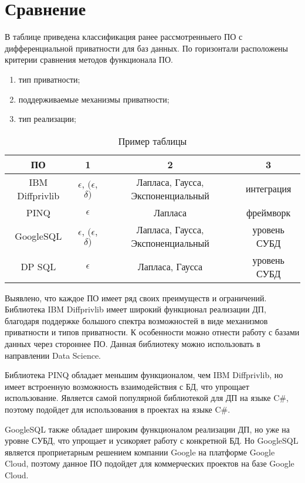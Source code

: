 \chapter{Сравнение}

В таблице приведена классификация ранее рассмотренныего ПО с дифференциальной приватности для баз данных.
По горизонтали расположены критерии сравнения методов функционала ПО.

\begin{enumerate}
	\item  тип приватности;
	\item поддерживаемые механизмы приватности;
	\item тип реализации;
\end{enumerate}

\begin{table}[h]
	\centering
	\begin{tabular}{|c|c|c|c|}
		\hline
		ПО & 1 & 2 & 3 \\ \hline
		IBM Diffprivlib & $\epsilon$, $(\epsilon$, $\delta)$  & \parbox{4.5cm}{Лапласа, Гаусса, Экспоненциальный} & интеграция  \\ \hline
		PINQ &  $\epsilon$ & Лапласа  & фреймворк  \\ \hline
		GoogleSQL  & $\epsilon$, $(\epsilon$, $\delta)$ & \parbox{4.5cm}{Лапласа, Гаусса, Экспоненциальный}  & уровень СУБД \\ \hline
		DP SQL  & $\epsilon$ & \parbox{4.5cm}{Лапласа, Гаусса}  & уровень СУБД \\ \hline
	\end{tabular}
	\caption{Пример таблицы}
\end{table}

Выявлено, что каждое ПО имеет ряд своих преимуществ и ограничений.
Библиотека IBM Diffprivlib имеет широкий функционал реализации ДП, благодаря поддержке большого спектра возможностей в виде механизмов приватности и типов приватности.
К особенности можно отнести работу с базами данных через стороннее ПО.
Данная библиотеку можно использовать в направлении Data Science.

Библиотека PINQ обладает меньшим функционалом, чем IBM Diffprivlib, но имеет встроенную возможность взаимодействия с БД, что упрощает использование.
Является самой популярной библиотекой для ДП на языке C\#, поэтому подойдет для использования в проектах на языке C\#.

GoogleSQL также обладает широким функционалом реализации ДП, но уже на уровне СУБД, что упрощает и усикоряет работу с конкретной БД.
Но GoogleSQL является проприетарным решением компании Google на платформе Google Cloud, поэтому данное ПО подойдет для коммерческих проектов на базе Google Cloud.

